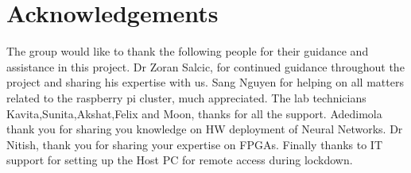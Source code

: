 \documentclass[compsoc,a4paper,12pt,conference,onecolumn]{IEEEtran}
\begin{document}
\doublespacing






\singlespacing
\tableofcontents
\listoffigures
\doublespacing








\section{Acknowledgements}
The group would like to thank the following people for their guidance and assistance in this project. Dr Zoran Salcic, for continued guidance throughout the project and sharing his expertise with us. Sang Nguyen for helping on all matters related to the raspberry pi cluster, much appreciated. The lab technicians Kavita,Sunita,Akshat,Felix and Moon, thanks for all the support. Adedimola thank you for sharing you knowledge on HW deployment of Neural Networks. Dr Nitish, thank you for sharing your expertise on FPGAs. Finally thanks to IT support for setting up the Host PC for remote access during lockdown. 






\end{document}
